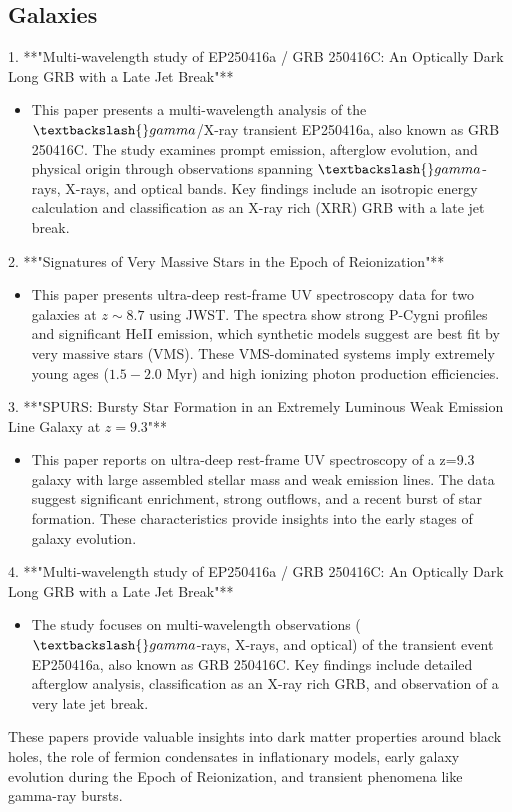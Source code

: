 \documentclass[11pt]{article}
\begin{document}
\subsection*{Galaxies}
1. **"Multi-wavelength study of EP250416a / GRB 250416C: An Optically Dark Long GRB with a Late Jet Break"**
\begin{itemize}
\item This paper presents a multi-wavelength analysis of the $\textbackslash{}gamma$/X-ray transient EP250416a, also known as GRB 250416C. The study examines prompt emission, afterglow evolution, and physical origin through observations spanning $\textbackslash{}gamma$-rays, X-rays, and optical bands. Key findings include an isotropic energy calculation and classification as an X-ray rich (XRR) GRB with a late jet break.
\end{itemize}
2. **"Signatures of Very Massive Stars in the Epoch of Reionization"**
\begin{itemize}
\item This paper presents ultra-deep rest-frame UV spectroscopy data for two galaxies at $z\sim 8.7$ using JWST. The spectra show strong P-Cygni profiles and significant HeII emission, which synthetic models suggest are best fit by very massive stars (VMS). These VMS-dominated systems imply extremely young ages ($1.5-2.0$ Myr) and high ionizing photon production efficiencies.
\end{itemize}
3. **"SPURS: Bursty Star Formation in an Extremely Luminous Weak Emission Line Galaxy at $z=9.3$"**
\begin{itemize}
\item This paper reports on ultra-deep rest-frame UV spectroscopy of a z=9.3 galaxy with large assembled stellar mass and weak emission lines. The data suggest significant enrichment, strong outflows, and a recent burst of star formation. These characteristics provide insights into the early stages of galaxy evolution.
\end{itemize}
4. **"Multi-wavelength study of EP250416a / GRB 250416C: An Optically Dark Long GRB with a Late Jet Break"**
\begin{itemize}
\item The study focuses on multi-wavelength observations ($\textbackslash{}gamma$-rays, X-rays, and optical) of the transient event EP250416a, also known as GRB 250416C. Key findings include detailed afterglow analysis, classification as an X-ray rich GRB, and observation of a very late jet break.
\end{itemize}
These papers provide valuable insights into dark matter properties around black holes, the role of fermion condensates in inflationary models, early galaxy evolution during the Epoch of Reionization, and transient phenomena like gamma-ray bursts.
\newpage
\end{document}
